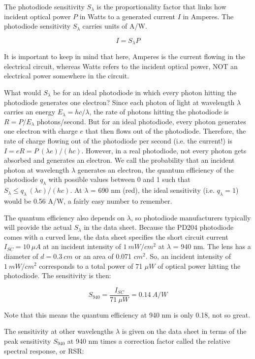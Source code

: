 \documentclass[10pt]{PhysLab1C} %
\begin{document}
The photodiode sensitivity $S_{\lambda}$ is the proportionality factor that links how incident optical power $P$ in Watts to a
generated current $I$ in Amperes. The photodiode sensitivity $S_{\lambda}$ carries units of A/W.

$$I=S_{\lambda}P$$

It is important to keep in mind that here, Amperes is the current flowing in the electrical circuit, whereas Watts
refers to the incident optical power, NOT an electrical power somewhere in the circuit.

What would $S_{\lambda}$ be for an ideal photodiode in which every photon hitting the photodiode
generates one electron? Since each photon of light at wavelength $\lambda$ carries an energy $E_{\lambda}=hc/\lambda$, the
rate of photons hitting the photodiode is $R=P/E_{\lambda}$ photons/second. But for an ideal photodiode,
every photon generates one electron with charge $e$ that then flows out of the photodiode. Therefore,
the rate of charge flowing out of the photodiode per second (i.e. the current!) is $I=eR=P~(\lambda e)/(hc)$. However, in a real photodiode, not every photon gets absorbed and generates an electron. We call
the probability that an incident photon at wavelength $\lambda$ generates an electron, the quantum efficiency
of the photodiode $q_{\lambda}$ with possible values between 0 and 1 such that $S_{\lambda}\le q_{\lambda}~(\lambda e)/(hc)$. At $\lambda$ = 690 nm (red), the ideal sensitivity (i.e. $q_{\lambda}= 1$) would be 0.56 A/W, a fairly easy number to remember.

The quantum efficiency also depends on $\lambda$, so photodiode manufacturers typically will provide the actual $S_{\lambda}$ in
the data sheet. Because the PD204 photodiode comes with a curved lens, the data sheet specifies the short
circuit current $I_{SC} = 10 ~\mu A$ at an incident intensity of $1 ~mW/cm^2$ at $\lambda$ = 940 nm. The lens has a diameter of $d = 0.3 ~cm$ or an area of 0.071 $cm^2$. So, an incident intensity of $1 ~mW/cm^2$ corresponds to a total power of
71 $\mu W$ of optical power hitting the photodiode. The sensitivity is then:

$$S_{940} = \frac{I_{SC}}{71~\mu W} = 0.14~A/W$$

Note that this means the quantum efficiency at 940 nm is only 0.18, not so great.

The sensitivity at other wavelengths $\lambda$ is given on the data sheet in terms of the peak sensitivity $S_{940}$ at 940 nm
times a correction factor called the relative spectral response, or RSR:
\end{document}
